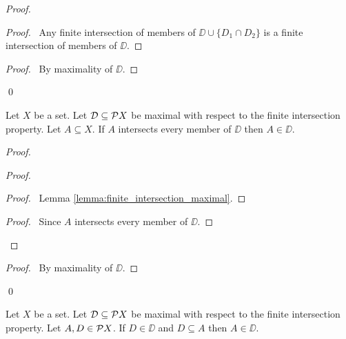 \begin{proof}
    \pf
    \begin{proof}
        \pf\ Any finite intersection of members of $\DD \cup \{ D_1 \cap D_2 \}$
        is a finite intersection of members of $\DD$.
    \end{proof}
    \begin{proof}
        \pf\ By maximality of $\DD$.
    \end{proof}
    \qed
\end{proof}

\begin{lemma}
    \label{lemma:member_maximal_finite_intersection}
    Let $X$ be a set. Let $\mathcal{D} \subseteq \mathcal{P} X$ be maximal with respect to the finite intersection property.
    Let $A \subseteq X$. If $A$ intersects every member of $\DD$ then $A \in \DD$.
\end{lemma}

\begin{proof}
    \pf
    \begin{proof}
        \begin{proof}
            \pf\ Lemma \ref{lemma:finite_intersection_maximal}.
        \end{proof}
        \begin{proof}
            \pf\ Since $A$ intersects every member of $\DD$.
        \end{proof}
    \end{proof}
    \qedstep
    \begin{proof}
        \pf\ By maximality of $\DD$.
    \end{proof}
    \qed
\end{proof}

\begin{proposition}
    Let $X$ be a set. Let $\mathcal{D} \subseteq \mathcal{P} X$ be maximal with respect to the
    finite intersection property. Let $A, D \in \mathcal{P} X$.
    If $D \in \DD$ and $D \subseteq A$ then $A \in \DD$.
\end{proposition}

